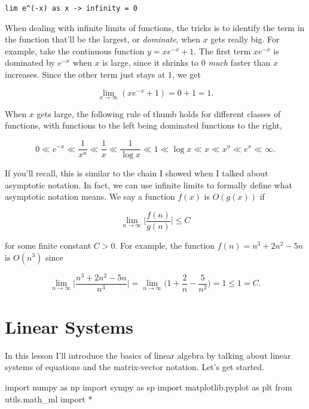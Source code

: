 \documentclass[
  letterpaper,
  DIV=11,
  numbers=noendperiod]{scrreprt}
\newenvironment{Shaded}{\begin{snugshade}}{\end{snugshade}}
\newcommand{\ImportTok}[1]{\textcolor[rgb]{0.00,0.46,0.62}{#1}}
\newcommand{\NormalTok}[1]{\textcolor[rgb]{0.00,0.23,0.31}{#1}}
\newcommand{\OperatorTok}[1]{\textcolor[rgb]{0.37,0.37,0.37}{#1}}
\begin{document}
\begin{verbatim}
lim e^(-x) as x -> infinity = 0
\end{verbatim}

When dealing with infinite limits of functions, the tricks is to
identify the term in the function that'll be the largest, or
\emph{dominate}, when \(x\) gets really big. For example, take the
continuous function \(y=x e^{-x} + 1\). The first term \(xe^{-x}\) is
dominated by \(e^{-x}\) when \(x\) is large, since it shrinks to \(0\)
\emph{much} faster than \(x\) increases. Since the other term just stays
at \(1\), we get

\[\lim_{x \rightarrow \infty} (x e^{-x} + 1) = 0 + 1 = 1.\]

When \(x\) gets large, the following rule of thumb holds for different
classes of functions, with functions to the left being dominated
functions to the right,

\[0 \ll e^{-x} \ll \frac{1}{x^n} \ll \frac{1}{x} \ll \frac{1}{\log x} \ll 1 \ll \log x \ll x \ll x^n \ll e^x \ll \infty.\]

If you'll recall, this is similar to the chain I showed when I talked
about asymptotic notation. In fact, we can use infinite limits to
formally define what asymptotic notation means. We say a function
\(f(x)\) is \(O(g(x))\) if

\[\lim_{n \rightarrow \infty} \bigg|\frac{f(n)}{g(n)}\bigg| \leq C\]

for some finite constant \(C > 0\). For example, the function
\(f(n) = n^3 + 2n^2 - 5n\) is \(O(n^3)\) since

\[\lim_{n \rightarrow \infty} \bigg|\frac{n^3 + 2n^2 - 5n}{n^3}\bigg| =  \lim_{n \rightarrow \infty} \bigg(1 + \frac{2}{n} - \frac{5}{n^2}\bigg) = 1 \leq 1 = C.\]


\hypertarget{linear-systems}{%
\chapter{Linear Systems}\label{linear-systems}}

In this lesson I'll introduce the basics of linear algebra by talking
about linear systems of equations and the matrix-vector notation. Let's
get started.

\begin{Shaded}
\begin{Highlighting}[]
\ImportTok{import}\NormalTok{ numpy }\ImportTok{as}\NormalTok{ np}
\ImportTok{import}\NormalTok{ sympy }\ImportTok{as}\NormalTok{ sp}
\ImportTok{import}\NormalTok{ matplotlib.pyplot }\ImportTok{as}\NormalTok{ plt}
\ImportTok{from}\NormalTok{ utils.math\_ml }\ImportTok{import} \OperatorTok{*}
\end{Highlighting}
\end{Shaded}
\end{document}
